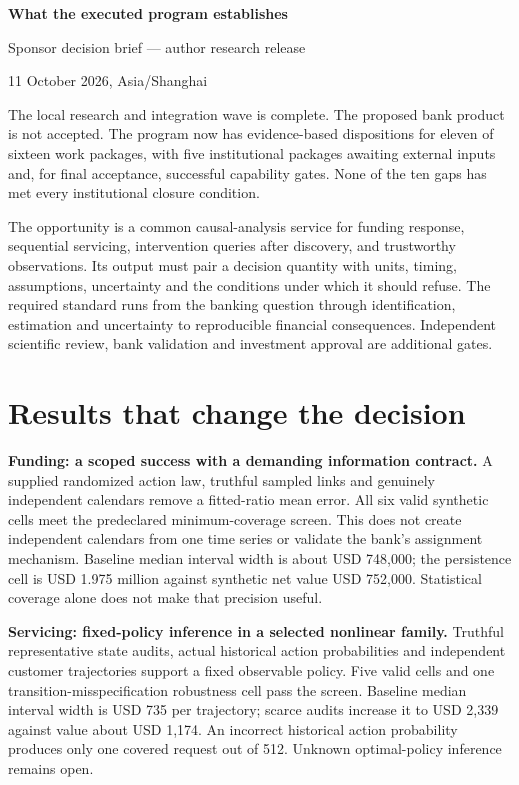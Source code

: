 \documentclass[11pt,a4paper]{article}
\begin{document}
\begin{center}{\LARGE\bfseries What the executed program establishes\par}\vspace{3mm}
{\large Sponsor decision brief --- author research release\par}
11 October 2026, Asia/Shanghai\end{center}

The local research and integration wave is complete. The proposed bank product is not accepted. The program now has evidence-based dispositions for eleven of sixteen work packages, with five institutional packages awaiting external inputs and, for final acceptance, successful capability gates. None of the ten gaps has met every institutional closure condition.

The opportunity is a common causal-analysis service for funding response, sequential servicing, intervention queries after discovery, and trustworthy observations. Its output must pair a decision quantity with units, timing, assumptions, uncertainty and the conditions under which it should refuse. The required standard runs from the banking question through identification, estimation and uncertainty to reproducible financial consequences. Independent scientific review, bank validation and investment approval are additional gates.

\section*{Results that change the decision}
\textbf{Funding: a scoped success with a demanding information contract.}
A supplied randomized action law, truthful sampled links and genuinely independent calendars remove a fitted-ratio mean error. All six valid synthetic cells meet the predeclared minimum-coverage screen. This does not create independent calendars from one time series or validate the bank's assignment mechanism. Baseline median interval width is about USD 748,000; the persistence cell is USD 1.975 million against synthetic net value USD 752,000. Statistical coverage alone does not make that precision useful.

\textbf{Servicing: fixed-policy inference in a selected nonlinear family.}
Truthful representative state audits, actual historical action probabilities and independent customer trajectories support a fixed observable policy. Five valid cells and one transition-misspecification robustness cell pass the screen. Baseline median interval width is USD 735 per trajectory; scarce audits increase it to USD 2,339 against value about USD 1,174. An incorrect historical action probability produces only one covered request out of 512. Unknown optimal-policy inference remains open.
\end{document}
